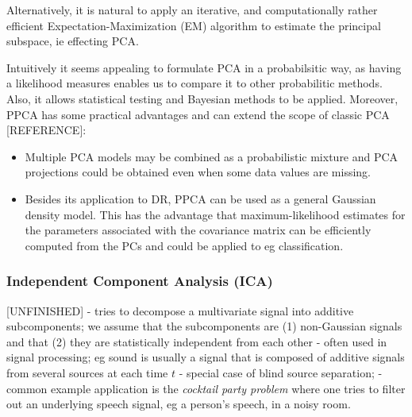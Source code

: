 \documentclass[journal, a4paper]{IEEEtran}
\begin{document}
Alternatively, it is natural to apply an iterative, and computationally rather efficient Expectation-Maximization (EM) algorithm to estimate the principal subspace, ie effecting PCA.


Intuitively it seems appealing to formulate PCA in a probabilsitic way, as having a likelihood measures enables us to compare it to other probabilitic methods. Also, it allows statistical testing and Bayesian methods to be applied. 
Moreover, PPCA has some practical advantages and can extend the scope of classic PCA [REFERENCE]:
\begin{itemize}
	\item  Multiple PCA models may be combined as a probabilistic mixture and PCA projections could be obtained even when some data values are missing.
	\item Besides its application to DR, PPCA can be used as a general Gaussian density model. This has the advantage that maximum-likelihood estimates for the parameters associated with the covariance matrix can be efficiently computed from the PCs and could be applied to eg classification. 
\end{itemize}


\hfill
\subsubsection{Independent Component Analysis (ICA)}
[UNFINISHED]
- tries to decompose a multivariate signal into additive subcomponents;
we assume that the subcomponents are (1) non-Gaussian signals and that (2) they are statistically independent from each other
- often used in signal processing; eg sound is usually a signal that is composed of additive signals from several sources at each time \( t \)
- special case of blind source separation;
- common example application is the \textit{cocktail party problem} where one tries to filter out an underlying speech signal, eg a person's speech, in a noisy room. 
\end{document}
